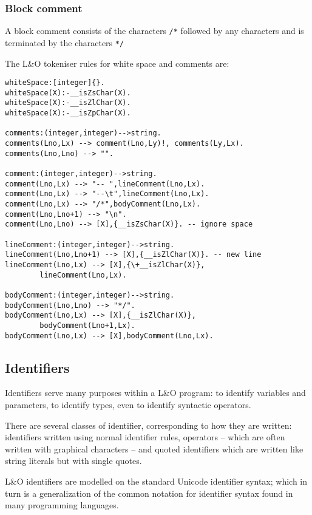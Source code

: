 \subsubsection{Block comment}
\label{token:blockcomment}
A block comment consists of the characters \verb+/*+ followed by any characters and is terminated by the characters \verb+*/+

The L&O tokeniser rules for white space and comments are:
\begin{verbatim}
whiteSpace:[integer]{}.
whiteSpace(X):-__isZsChar(X).
whiteSpace(X):-__isZlChar(X).
whiteSpace(X):-__isZpChar(X).

comments:(integer,integer)-->string.
comments(Lno,Lx) --> comment(Lno,Ly)!, comments(Ly,Lx).
comments(Lno,Lno) --> "".

comment:(integer,integer)-->string.
comment(Lno,Lx) --> "-- ",lineComment(Lno,Lx).
comment(Lno,Lx) --> "--\t",lineComment(Lno,Lx).
comment(Lno,Lx) --> "/*",bodyComment(Lno,Lx).
comment(Lno,Lno+1) --> "\n".
comment(Lno,Lno) --> [X],{__isZsChar(X)}. -- ignore space

lineComment:(integer,integer)-->string.
lineComment(Lno,Lno+1) --> [X],{__isZlChar(X)}. -- new line
lineComment(Lno,Lx) --> [X],{\+__isZlChar(X)},
        lineComment(Lno,Lx).

bodyComment:(integer,integer)-->string.
bodyComment(Lno,Lno) --> "*/".
bodyComment(Lno,Lx) --> [X],{__isZlChar(X)},
        bodyComment(Lno+1,Lx).
bodyComment(Lno,Lx) --> [X],bodyComment(Lno,Lx).
\end{verbatim}

\subsection{Identifiers}
\label{token:identifier}
Identifiers serve many purposes within a L&O program: to identify variables and parameters, to identify types, even to identify syntactic operators.

There are several classes of identifier, corresponding to how they are written: identifiers written using normal identifier rules, operators -- which are often written with graphical characters -- and quoted identifiers which are written like string literals but with single quotes.

L&O identifiers are modelled on the standard Unicode identifier syntax; which in turn is a generalization of the common notation for identifier syntax found in many programming languages.

